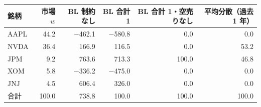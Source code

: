 \begin{tabular}{lrrrrr}
\toprule
銘柄 & 市場 $w$ & BL 制約なし & BL 合計 1 & BL 合計 1・空売りなし & 平均分散（過去 1 年） \\
\midrule
AAPL & 44.2 & \ensuremath{-}462.1 & \ensuremath{-}580.8 & 0.0 & 0.0 \\
NVDA & 36.4 & 166.9 & 116.5 & 0.0 & 53.2 \\
JPM & 9.2 & 763.6 & 713.3 & 100.0 & 46.8 \\
XOM & 5.8 & \ensuremath{-}336.2 & \ensuremath{-}475.0 & 0.0 & 0.0 \\
JNJ & 4.5 & 606.4 & 326.0 & 0.0 & 0.0 \\
\midrule
合計 & 100.0 & 738.8 & 100.0 & 100.0 & 100.0 \\
\bottomrule
\end{tabular}

